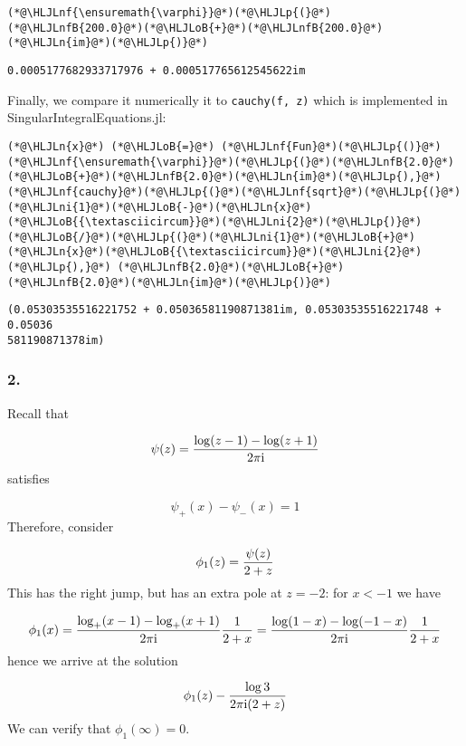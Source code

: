 \documentclass[12pt,landscape]{article}
\newcommand{\HLJLn}[1]{#1}
\newcommand{\HLJLnf}[1]{\textcolor[RGB]{66,102,213}{#1}}
\newcommand{\HLJLnfB}[1]{\textcolor[RGB]{59,151,46}{#1}}
\newcommand{\HLJLni}[1]{\textcolor[RGB]{59,151,46}{#1}}
\newcommand{\HLJLoB}[1]{\textcolor[RGB]{102,102,102}{\textbf{#1}}}
\newcommand{\HLJLp}[1]{#1}
\def\I{ {\rm i} }
\begin{document}
{\begin{lstlisting}
(*@\HLJLnf{\ensuremath{\varphi}}@*)(*@\HLJLp{(}@*)(*@\HLJLnfB{200.0}@*)(*@\HLJLoB{+}@*)(*@\HLJLnfB{200.0}@*)(*@\HLJLn{im}@*)(*@\HLJLp{)}@*)
\end{lstlisting}

\begin{lstlisting}
0.0005177682933717976 + 0.000517765612545622im
\end{lstlisting}


Finally, we compare it numerically it to \texttt{cauchy(f, z)} which is implemented in SingularIntegralEquations.jl:


\begin{lstlisting}
(*@\HLJLn{x}@*) (*@\HLJLoB{=}@*) (*@\HLJLnf{Fun}@*)(*@\HLJLp{()}@*)
(*@\HLJLnf{\ensuremath{\varphi}}@*)(*@\HLJLp{(}@*)(*@\HLJLnfB{2.0}@*)(*@\HLJLoB{+}@*)(*@\HLJLnfB{2.0}@*)(*@\HLJLn{im}@*)(*@\HLJLp{),}@*)(*@\HLJLnf{cauchy}@*)(*@\HLJLp{(}@*)(*@\HLJLnf{sqrt}@*)(*@\HLJLp{(}@*)(*@\HLJLni{1}@*)(*@\HLJLoB{-}@*)(*@\HLJLn{x}@*)(*@\HLJLoB{{\textasciicircum}}@*)(*@\HLJLni{2}@*)(*@\HLJLp{)}@*)(*@\HLJLoB{/}@*)(*@\HLJLp{(}@*)(*@\HLJLni{1}@*)(*@\HLJLoB{+}@*)(*@\HLJLn{x}@*)(*@\HLJLoB{{\textasciicircum}}@*)(*@\HLJLni{2}@*)(*@\HLJLp{),}@*) (*@\HLJLnfB{2.0}@*)(*@\HLJLoB{+}@*)(*@\HLJLnfB{2.0}@*)(*@\HLJLn{im}@*)(*@\HLJLp{)}@*)
\end{lstlisting}

\begin{lstlisting}
(0.05303535516221752 + 0.05036581190871381im, 0.05303535516221748 + 0.05036
581190871378im)
\end{lstlisting}


\subsubsection{2.}
Recall that

\[
\psi(z) = {\log(z-1) - \log(z+1)  \over 2 \pi \I}
\]
satisfies

\[
\psi_+(x) - \psi_-(x) = 1
\]
Therefore, consider

\[
\phi_1(z) = {\psi(z) \over 2 + z}
\]
This has the right jump, but has an extra pole at $z = -2$: for $x < -1$ we have

\[
\phi_1(x) = {\log_+(x-1) - \log_+(x+1)  \over 2 \pi \I} {1 \over 2 + x} =
   {\log(1-x) - \log(-1-x)  \over 2 \pi \I} {1 \over 2 + x}
\]
hence we arrive at the solution

\[
\phi_1(z) - {\log 3 \over 2 \pi \I (2+z)}
\]
We can verify that $\phi_1(\infty) = 0$.


}
\end{document}
